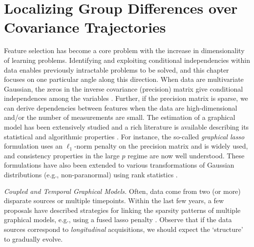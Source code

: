 \chapter{Localizing Group Differences over
Covariance Trajectories}\label{sec:covtraj}

Feature selection has become a core problem with the increase in dimensionality of learning problems.
Identifying and exploiting conditional independencies within data enables previously intractable problems to be solved,
and this chapter focuses on one particular angle along this direction.
When data are multivariate Gaussian, the zeros in the inverse covariance (precision) matrix give conditional independences 
among the variables \citep{lauritzen1996graphical}. 
Further, if the precision matrix is sparse, we can
derive dependencies between features when the data are high-dimensional and/or the number of measurements are small. 
The estimation of a graphical model
has been extensively studied
and a rich literature is available describing 
its statistical and algorithmic properties \citep{koller2009probabilistic,jordan1998learning}. 
For instance, the so-called \textit{graphical lasso} formulation uses an $\ell_1$-norm penalty on the 
precision matrix and is widely used, and consistency properties 
in the large $p$ regime \citep{cai2011constrained,friedman2008sparse,yuan2010high} are now well understood.
These formulations have also been extended to various transformations of Gaussian distributions (e.g., non-paranormal)
using rank statistics \citep{liu2009nonparanormal,xue2012regularized,liu2012high}.

{\em Coupled and Temporal Graphical Models.} 
Often, data come from two (or more) disparate sources or multiple timepoints.
Within the last few years, a few proposals have 
described strategies for linking the sparsity patterns of multiple graphical models, e.g., using a fused lasso 
penalty \citep{danaher2014joint} \citep{yang2015fused}. Observe that 
if the data sources correspond to {\em longitudinal} acquisitions, we should expect 
the `structure' to gradually evolve.

